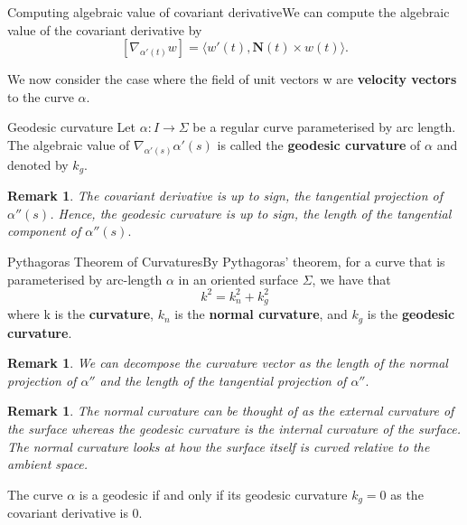 \documentclass[twoside]{article}
\newtheorem{remark}[theorem]{Remark}
\begin{document}
\begin{proposition_exam}{Computing algebraic value of covariant derivative}{}We can compute the algebraic value of the covariant derivative by 
$$
[\nabla_{\alpha'(t)}w] = \langle w'(t), \mathbf{N}(t) \times w(t)\rangle.
$$
\end{proposition_exam}

We now consider the case where the field of unit vectors w are \textbf{velocity vectors} to the curve $\alpha.$

\begin{definition_exam}{Geodesic curvature}{} Let $\alpha: I \rightarrow \Sigma$ be a regular curve parameterised by arc length. The algebraic value of $\nabla_{\alpha'(s)}\alpha'(s)$ is called the \textbf{geodesic curvature} of $\alpha$ and denoted by $k_g.$
\end{definition_exam}

\begin{remark}The covariant derivative is up to sign, the tangential projection of $\alpha''(s)$. Hence, the geodesic curvature is up to sign, the length of the tangential component of $\alpha''(s).$
\end{remark}

\begin{theorem_exam}{Pythagoras Theorem of Curvatures}{}By Pythagoras' theorem, for a curve that is parameterised by arc-length $\alpha$ in an oriented surface $\Sigma$, we have that 
$$
k^2 = k_{n}^{2} + k_{g}^{2}
$$
where k is the \textbf{curvature}, $k_n$ is the \textbf{normal curvature}, and $k_g$ is the \textbf{geodesic curvature}. 
\end{theorem_exam}

\begin{remark}We can decompose the curvature vector as the length of the normal projection of $\alpha''$ and the length of the tangential projection of $\alpha''.$
\end{remark}

\begin{remark}The normal curvature can be thought of as the external curvature of the surface whereas the geodesic curvature is the internal curvature of the surface. The normal curvature looks at how the surface itself is curved relative to the ambient space.
\end{remark}


\begin{theorem_exam}{}{}The curve $\alpha$ is a geodesic if and only if its geodesic curvature $k_g = 0$ as the covariant derivative is 0.
\end{theorem_exam}
\end{document}

